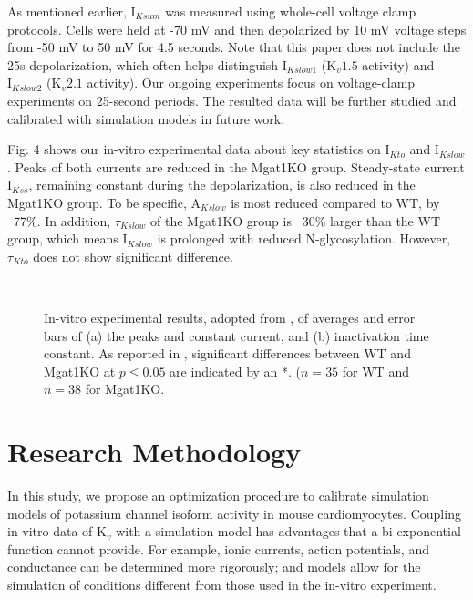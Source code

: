 \documentclass[journal]{IEEEtran}
\begin{document}
As mentioned earlier, $\text{I}_{Ksum}$ was measured using whole-cell voltage clamp protocols. Cells were held at -70 mV and then depolarized by 10 mV voltage steps from -50 mV to 50 mV for 4.5 seconds. Note that this paper does not include the 25s depolarization, which often helps distinguish $\text{I}_{Kslow1}$ ($\text{K}_{v}1.5$ activity) and $\text{I}_{Kslow2}$ ($\text{K}_{v}2.1$ activity). Our ongoing experiments focus on voltage-clamp experiments on 25-second periods. The resulted data will be further studied and calibrated with simulation models in future work.

Fig. 4 shows our in-vitro experimental data about key statistics on $\text{I}_{Kto}$ and $\text{I}_{Kslow}$. Peaks of both currents are reduced in the Mgat1KO group. Steady-state current $\text{I}_{Kss}$, remaining constant during the depolarization, is also reduced in the Mgat1KO group. To be specific, $\text{A}_{Kslow}$ is most reduced compared to WT, by ~77\%. In addition, $\tau_{Kslow}$ of the Mgat1KO group is ~30\% larger than the WT group, which means $\text{I}_{Kslow}$ is prolonged with reduced N-glycosylation. However, $\tau_{Kto}$ does not show significant difference.
\begin{figure}
    \label{fig4}
    \centering
    \\
    \caption{In-vitro experimental results, adopted from \cite{ednie2019reduced}, of averages and error bars of (a) the peaks and constant current, and (b) inactivation time constant. As reported in \cite{ednie2019reduced}, significant differences between WT and Mgat1KO at $p \leq 0.05$ are indicated by an *. ($n=35$ for WT and $n=38$ for Mgat1KO.}
\end{figure}

\section{Research Methodology}
In this study, we propose an optimization procedure to calibrate simulation models of potassium channel isoform activity in mouse cardiomyocytes. Coupling in-vitro data of $\text{K}_{v}$ with a simulation model has advantages that a bi-exponential function cannot provide. For example, ionic currents, action potentials, and conductance can be determined more rigorously; and models allow for the simulation of conditions different from those used in the in-vitro experiment. 
\end{document}
